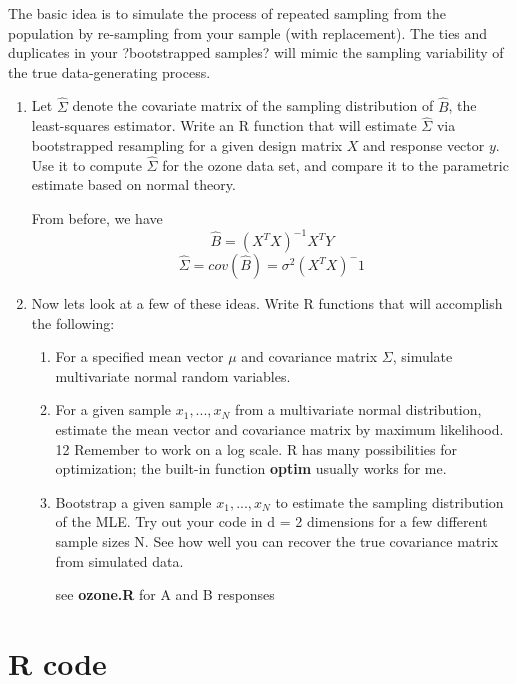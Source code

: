 \documentclass{homework}
\begin{document}
The basic idea is to simulate the process of repeated sampling from the population by re-sampling from your sample (with replacement). 
The ties and duplicates in your ?bootstrapped samples? will mimic the sampling variability of the true data-generating process. 
\begin{enumerate}[label=(\Alph*)]
\item Let $\hat{\Sigma}$ denote the covariate matrix of the sampling distribution of $\hat{B}$,
the least-squares estimator. Write an R function that will estimate $\hat{\Sigma}$ via bootstrapped resampling for a given design matrix $X$ and response vector $y$. Use it to compute $\hat{\Sigma}$  for the ozone data set, and compare it to the parametric estimate based on normal theory.

\par From before, we have 
$$\hat{B} = (X^TX)^{-1}X^TY$$
$$ \hat{\Sigma} = cov( \hat{B} ) = \sigma^2(X^TX)^-1$$

\item Now lets look at a few of these ideas. Write R functions that will accomplish the following:
\begin{enumerate}
\item For a specified mean vector $\mu$ and covariance matrix $\Sigma$, simulate multivariate normal random variables.
\item For a given sample $x_1, . . . , x_N$ from a multivariate normal distribution, estimate the mean vector and covariance matrix by maximum likelihood. 12 Remember to work on a log scale. R has many possibilities for optimization; the built-in function \textbf{optim} usually works for me. 
\item Bootstrap a given sample $x_1, . . . , x_N$ to estimate the sampling distribution of the MLE.
Try out your code in d = 2 dimensions for a few different sample sizes N. See how well you can recover the true covariance matrix from simulated data.

\par * see \textbf{ozone.R} for A and B responses
\end{enumerate}
\end{enumerate}

\clearpage

\appendix
\chapter{R code}
\label{chap:code}
\end{document}
